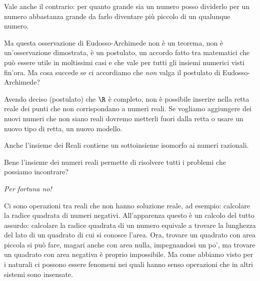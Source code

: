 Vale anche il contrario: per quanto grande sia un numero posso dividerlo per un 
numero abbastanza grande da farlo diventare più piccolo di un qualunque numero.

Ma questa osservazione di Eudosso-Archimede non è un teorema, non è 
un'osservazione dimostrata, è un postulato, un accordo fatto tra matematici che 
può essere utile in moltissimi casi e che vale per tutti gli insiemi numerici 
visti fin'ora. Ma cosa succede se ci accordiamo che \emph{non} valga il 
postulato di Eudosso-Archimede? 

Avendo deciso (postulato) che \(\R\) è completo, non è possibile inserire nella 
retta reale dei punti che non corrispondano a numeri reali. Se vogliamo 
aggiungere dei nuovi numeri che non siano reali dovremo metterli fuori dalla 
retta o usare un nuovo tipo di retta, un nuovo modello.
% 
% 

Anche l'insieme dei Reali contiene un sottoinsieme isomorfo ai numeri razionali.

Bene l'insieme dei numeri reali permette di risolvere tutti i problemi che 
possiamo incontrare? 

\vspace{-1em} \begin{center} \emph{Per fortuna no!} \end{center} \vspace{-.5em} 

Ci sono operazioni tra reali che non hanno soluzione reale, 
ad esempio: calcolare la radice quadrata di numeri negativi. 
All'apparenza questo è un calcolo del tutto assurdo: calcolare la radice 
quadrata di un numero equivale a trovare la lunghezza del lato di un quadrato di 
cui si conosce l'area.
Ora, trovare un quadrato con area piccola si può fare, magari anche con area 
nulla, impegnandosi un po', ma trovare un quadrato con area negativa è proprio 
impossibile. Ma come abbiamo visto per i naturali ci possono essere fenomeni 
nei quali hanno senso operazioni che in altri sistemi sono insensate.

